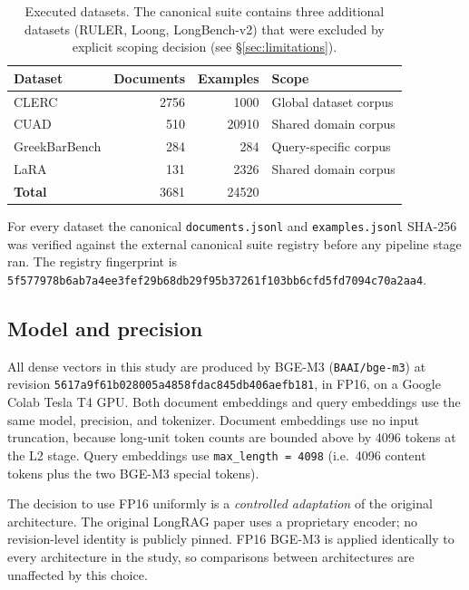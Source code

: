 \documentclass[11pt,a4paper]{article}
\begin{document}
\begin{table}[h]
\centering
\caption{Executed datasets. The canonical suite contains three
additional datasets (RULER, Loong, LongBench-v2) that were
excluded by explicit scoping decision (see \S\ref{sec:limitations}).}
\label{tab:datasets}
\small
\begin{tabular}{l r r l}
\toprule
\textbf{Dataset} & \textbf{Documents} & \textbf{Examples}
  & \textbf{Scope} \\
\midrule
CLERC              & \num{2756} & \num{1000}
  & Global dataset corpus \\
CUAD               & \num{510}  & \num{20910}
  & Shared domain corpus \\
GreekBarBench      & \num{284}  & \num{284}
  & Query-specific corpus \\
LaRA               & \num{131}  & \num{2326}
  & Shared domain corpus \\
\midrule
\textbf{Total}     & \num{3681} & \num{24520} & \\
\bottomrule
\end{tabular}
\end{table}

For every dataset the canonical \texttt{documents.jsonl} and
\texttt{examples.jsonl} SHA-256 was verified against the external
canonical suite registry before any pipeline stage ran. The
registry fingerprint is
\texttt{5f577978b6ab7a4ee3fef29b68db29f95b37261f103bb6cfd5fd7094c70a2aa4}.

\subsection{Model and precision}
All dense vectors in this study are produced by BGE-M3
(\texttt{BAAI/bge-m3}) at revision
\texttt{5617a9f61b028005a4858fdac845db406aefb181}, in FP16, on a
Google Colab Tesla T4 GPU. Both document embeddings and query
embeddings use the same model, precision, and tokenizer. Document
embeddings use no input truncation, because long-unit token counts
are bounded above by \SI{4096}{} tokens at the L2 stage. Query
embeddings use \texttt{max\_length = 4098} (i.e.\ \SI{4096}{} content
tokens plus the two BGE-M3 special tokens).

The decision to use FP16 uniformly is a \emph{controlled
adaptation} of the original architecture. The original LongRAG paper
uses a proprietary encoder; no revision-level identity is publicly
pinned. FP16 BGE-M3 is applied identically to every architecture in
the study, so comparisons between architectures are unaffected by
this choice.
\end{document}
